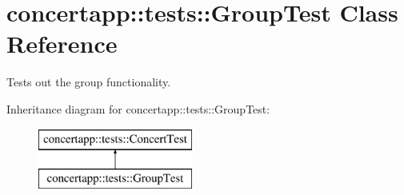 \hypertarget{classconcertapp_1_1tests_1_1_group_test}{
\section{concertapp::tests::GroupTest Class Reference}
\label{classconcertapp_1_1tests_1_1_group_test}
}


Tests out the group functionality.  


Inheritance diagram for concertapp::tests::GroupTest:\begin{figure}[H]
\begin{center}
\leavevmode
\includegraphics[height=2.000000cm]{classconcertapp_1_1tests_1_1_group_test}
\end{center}
\end{figure}
